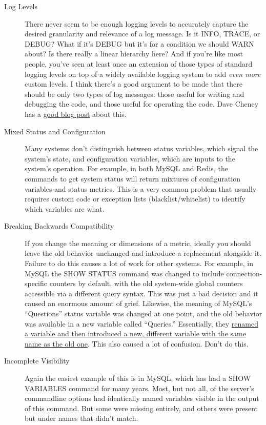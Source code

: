 \documentclass{vivid_layout}
\begin{document}
\begin{description}

\item[Log Levels] There never seem to be enough logging levels to accurately
capture the desired granularity and relevance of a log message. Is it INFO,
TRACE, or DEBUG? What if it's DEBUG but it's for a condition we should WARN
about? Is there really a linear hierarchy here? And if you're like most people,
you've seen at least once an extension of those types of standard logging levels
on top of a widely available logging system to add \emph{even more} custom
levels. I think there's a good argument to be made that there should be only two
types of log messages: those useful for writing and debugging the code, and
those useful for operating the code. Dave Cheney has a
\href{http://dave.cheney.net/2015/11/05/lets-talk-about-logging}{good blog post}
about this.

\item[Mixed Status and Configuration] Many systems don't distinguish between
status variables, which signal the system's state, and configuration variables,
which are inputs to the system's operation. For example, in both MySQL and
Redis, the commands to get system status will return mixtures of configuration
variables and status metrics. This is a very common problem that usually
requires custom code or exception lists (blacklist/whitelist) to identify which
variables are what.

\item[Breaking Backwards Compatibility] If you change the meaning or dimensions
of a metric, ideally you should leave the old behavior unchanged and introduce a
replacement alongside it. Failure to do this causes a lot of work for other
systems. For example, in MySQL the SHOW STATUS command was changed to include
connection-specific counters by default, with the old system-wide global
counters accessible via a different query syntax. This was just a bad decision
and it caused an enormous amount of grief. Likewise, the meaning of MySQL's
``Questions'' status variable was changed at one point, and the old behavior was
available in a new variable called ``Queries.'' Essentially, they
\href{http://dev.mysql.com/doc/refman/5.0/en/server-status-variables.html#statvar\_Questions}{renamed
a variable and then introduced a new, different variable with the same name as
the old one}. This also caused a lot of confusion. Don't do this.

\item[Incomplete Visibility] Again the easiest example of this is in MySQL,
which has had a SHOW VARIABLES command for many years. Most, but not all, of the
server's commandline options had identically named variables visible in the
output of this command. But some were missing entirely, and others were present
but under names that didn't match.


\end{description}
\end{document}
